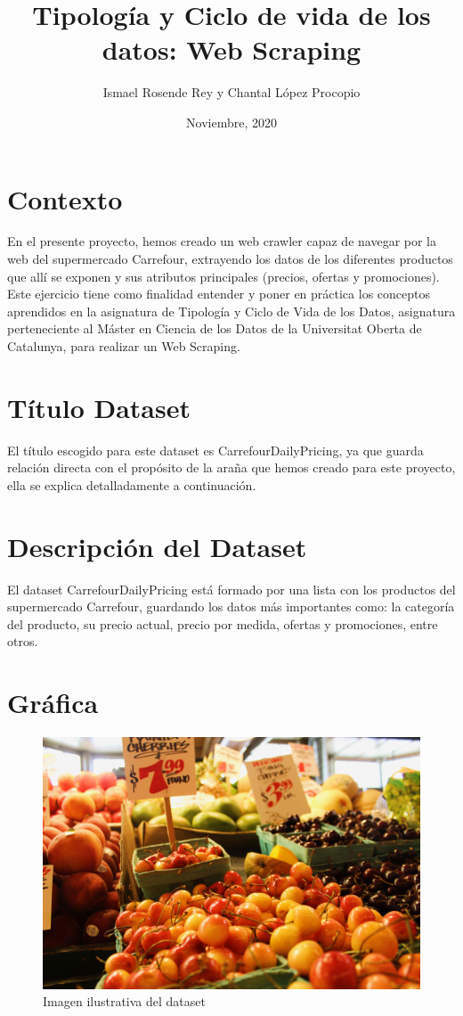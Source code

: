 \documentclass{article}
\title{Tipología y Ciclo de vida de los datos: Web Scraping}
\author{Ismael Rosende Rey y Chantal López Procopio}
\date{Noviembre, 2020}
\begin{document}
\maketitle

\section{Contexto}
En  el  presente  proyecto,  hemos creado un  web  crawler  capaz  de  navegar  por  la  web  del supermercado Carrefour, extrayendo los  datos  de los diferentes  productos que allí se exponen y sus atributos principales (precios,  ofertas  y promociones). Este ejercicio tiene como finalidad entender y poner en práctica los conceptos aprendidos  en la  asignatura  de Tipología  y  Ciclo  de  Vida  de  los  Datos, asignatura perteneciente al Máster en Ciencia de los Datos de la Universitat Oberta de Catalunya, para  realizar  un Web Scraping.

\section{Título Dataset}
El título escogido para este dataset es CarrefourDailyPricing, ya que guarda relación directa con el propósito de la araña que hemos creado para este proyecto, ella se explica detalladamente a continuación.

\section{Descripción del Dataset}
El dataset CarrefourDailyPricing está formado por una lista con los productos del supermercado Carrefour, guardando los datos más importantes como: la categoría del producto, su precio actual, precio por medida, ofertas y promociones, entre otros.

\section{Gráfica}

\begin{figure}[H]
    \centering
    \includegraphics[width=0.4\linewidth]{ImagenDataset.jpg}
    \caption{Imagen ilustrativa del dataset}
    \label{fig:dubs}
\end{figure}
\end{document}
